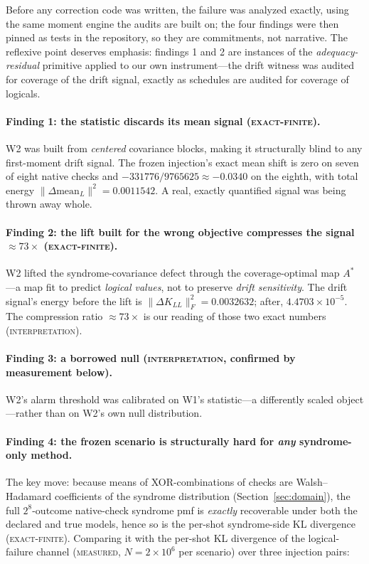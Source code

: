\documentclass[11pt]{article}
\newcommand{\grade}[1]{\textsc{#1}}
\newcommand{\gExact}{\grade{exact-finite}}
\newcommand{\gMeasured}{\grade{measured}}
\newcommand{\gInterp}{\grade{interpretation}}
\theoremstyle{definition}
\begin{document}
Before any correction code was written, the failure was analyzed exactly, using the same moment engine the audits are built on; the four findings were then pinned as tests in the repository, so they are commitments, not narrative. The reflexive point deserves emphasis: findings 1 and 2 are instances of the \emph{adequacy-residual} primitive applied to our own instrument---the drift witness was audited for coverage of the drift signal, exactly as schedules are audited for coverage of logicals.

\paragraph{Finding 1: the statistic discards its mean signal (\gExact).} W2 was built from \emph{centered} covariance blocks, making it structurally blind to any first-moment drift signal. The frozen injection's exact mean shift is zero on seven of eight native checks and $-331776/9765625 \approx -0.0340$ on the eighth, with total energy $\|\Delta\mathrm{mean}_L\|^{2} = 0.0011542$. A real, exactly quantified signal was being thrown away whole.

\paragraph{Finding 2: the lift built for the wrong objective compresses the signal $\approx 73\times$ (\gExact).} W2 lifted the syndrome-covariance defect through the coverage-optimal map $A^{*}$---a map fit to predict \emph{logical values}, not to preserve \emph{drift sensitivity}. The drift signal's energy before the lift is $\|\Delta K_{LL}\|_F^{2} = 0.0032632$; after, $4.4703 \times 10^{-5}$. The compression ratio $\approx 73\times$ is our reading of those two exact numbers (\gInterp).

\paragraph{Finding 3: a borrowed null (\gInterp, confirmed by measurement below).} W2's alarm threshold was calibrated on W1's statistic---a differently scaled object---rather than on W2's own null distribution. 

\paragraph{Finding 4: the frozen scenario is structurally hard for \emph{any} syndrome-only method.} The key move: because means of XOR-combinations of checks are Walsh--Hadamard coefficients of the syndrome distribution (Section~\ref{sec:domain}), the full $2^{8}$-outcome native-check syndrome pmf is \emph{exactly} recoverable under both the declared and true models, hence so is the per-shot syndrome-side KL divergence (\gExact). Comparing it with the per-shot KL divergence of the logical-failure channel (\gMeasured, $N = 2 \times 10^{6}$ per scenario) over three injection pairs: 
\end{document}
